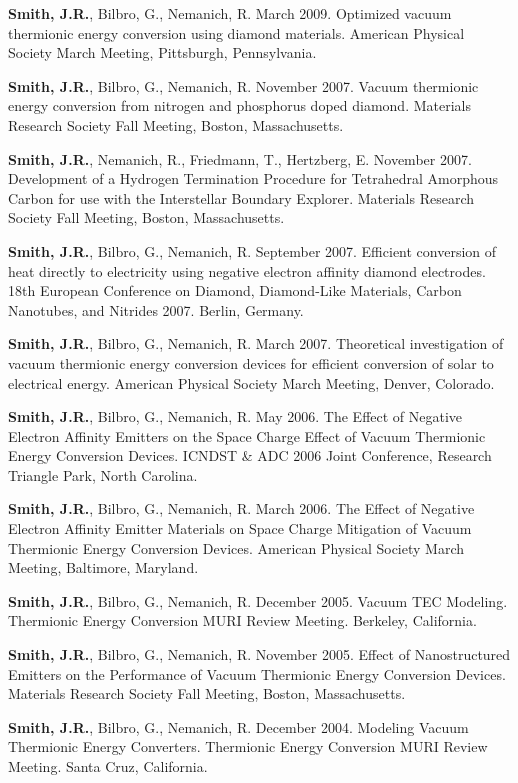 \textbf{Smith, J.R.}, Bilbro, G., Nemanich, R. March 2009. Optimized
vacuum thermionic energy conversion using diamond materials. American
Physical Society March Meeting, Pittsburgh, Pennsylvania.

\textbf{Smith, J.R.}, Bilbro, G., Nemanich, R. November 2007. Vacuum
thermionic energy conversion from nitrogen and phosphorus doped diamond.
Materials Research Society Fall Meeting, Boston, Massachusetts.

\textbf{Smith, J.R.}, Nemanich, R., Friedmann, T., Hertzberg, E.
November 2007. Development of a Hydrogen Termination Procedure for
Tetrahedral Amorphous Carbon for use with the Interstellar Boundary
Explorer. Materials Research Society Fall Meeting, Boston,
Massachusetts.

\textbf{Smith, J.R.}, Bilbro, G., Nemanich, R. September 2007. Efficient
conversion of heat directly to electricity using negative electron
affinity diamond electrodes. 18th European Conference on Diamond,
Diamond-Like Materials, Carbon Nanotubes, and Nitrides 2007. Berlin,
Germany.

\textbf{Smith, J.R.}, Bilbro, G., Nemanich, R. March 2007. Theoretical
investigation of vacuum thermionic energy conversion devices for
efficient conversion of solar to electrical energy. American Physical
Society March Meeting, Denver, Colorado.

\textbf{Smith, J.R.}, Bilbro, G., Nemanich, R. May 2006. The Effect of
Negative Electron Affinity Emitters on the Space Charge Effect of Vacuum
Thermionic Energy Conversion Devices. ICNDST \& ADC 2006 Joint
Conference, Research Triangle Park, North Carolina.

\textbf{Smith, J.R.}, Bilbro, G., Nemanich, R. March 2006. The Effect of
Negative Electron Affinity Emitter Materials on Space Charge Mitigation
of Vacuum Thermionic Energy Conversion Devices. American Physical
Society March Meeting, Baltimore, Maryland.

\textbf{Smith, J.R.}, Bilbro, G., Nemanich, R. December 2005. Vacuum TEC
Modeling. Thermionic Energy Conversion MURI Review Meeting. Berkeley,
California.

\textbf{Smith, J.R.}, Bilbro, G., Nemanich, R. November 2005. Effect of
Nanostructured Emitters on the Performance of Vacuum Thermionic Energy
Conversion Devices. Materials Research Society Fall Meeting, Boston,
Massachusetts.

\textbf{Smith, J.R.}, Bilbro, G., Nemanich, R. December 2004. Modeling
Vacuum Thermionic Energy Converters. Thermionic Energy Conversion MURI
Review Meeting. Santa Cruz, California.

